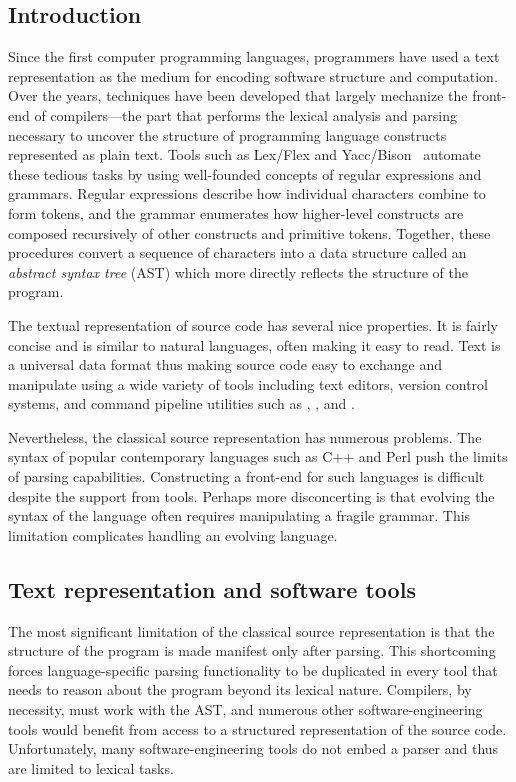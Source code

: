 \documentclass{article}
\begin{document}
\begin{multicols}{2}

\section{Introduction}
\label{sec-intro}

Since the first computer programming languages, programmers have used a
text representation as the medium for encoding software structure and
computation.  Over the years, techniques have been developed that
largely mechanize the front-end of compilers---the part that performs the lexical
analysis and parsing necessary to uncover the structure of programming
language constructs represented as plain text.  Tools such as Lex/Flex
and Yacc/Bison~\cite{Levine92} automate these tedious tasks by using
well-founded concepts of regular expressions and grammars. Regular
expressions describe how individual characters combine to form tokens,
and the grammar enumerates how higher-level constructs are composed
recursively of other constructs and primitive tokens.  Together, these
procedures convert a sequence of characters into a data structure
called an \emph{abstract syntax tree} (AST) which more directly reflects
the structure of the program.

The textual representation of source code has several nice properties.
It is fairly concise and is similar to natural languages, often making it
easy to read.  Text is a universal data format thus making source code
easy to exchange and manipulate using a wide variety of tools including
text editors, version control systems, and command pipeline utilities
such as , , and .

Nevertheless, the classical source representation has numerous problems.
The syntax of popular contemporary languages such as C++ and Perl push
the limits of parsing capabilities.  Constructing a front-end for such
languages is difficult despite the support from tools.  Perhaps more
disconcerting is that evolving the syntax of the language often requires
manipulating a fragile grammar.  This limitation complicates handling an
evolving language.

\subsection{Text representation and software tools}

The most significant limitation of the classical source
representation is that the structure of the program is made manifest
only after parsing.  This shortcoming forces language-specific parsing
functionality to be duplicated in every tool that needs to reason about
the program beyond its lexical nature.  Compilers, by necessity, must
work with the AST, and numerous other software-engineering tools would
benefit from access to a structured representation of the
source code.  Unfortunately, many software-engineering tools do not
embed a parser and thus are limited to lexical tasks.


\end{multicols}
\end{document}

